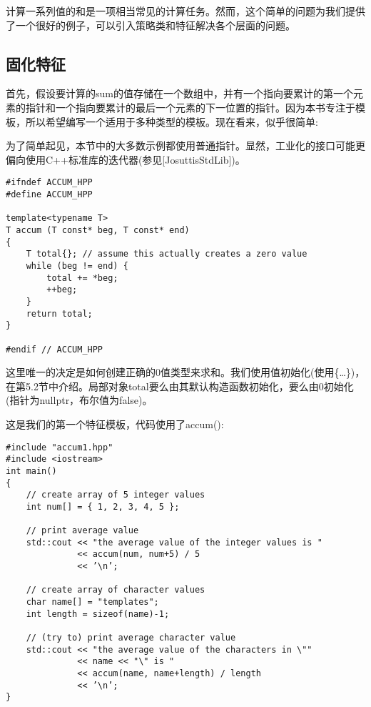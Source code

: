 
计算一系列值的和是一项相当常见的计算任务。然而，这个简单的问题为我们提供了一个很好的例子，可以引入策略类和特征解决各个层面的问题。

\subsection{固化特征}

首先，假设要计算的sum的值存储在一个数组中，并有一个指向要累计的第一个元素的指针和一个指向要累计的最后一个元素的下一位置的指针。因为本书专注于模板，所以希望编写一个适用于多种类型的模板。现在看来，似乎很简单:

\begin{tcolorbox}[colback=webgreen!5!white,colframe=webgreen!75!black]
\hspace*{0.75cm}为了简单起见，本节中的大多数示例都使用普通指针。显然，工业化的接口可能更偏向使用C++标准库的迭代器(参见[JosuttisStdLib])。
\end{tcolorbox}

\begin{lstlisting}[style=styleCXX]
#ifndef ACCUM_HPP
#define ACCUM_HPP

template<typename T>
T accum (T const* beg, T const* end)
{
	T total{}; // assume this actually creates a zero value
	while (beg != end) {
		total += *beg;
		++beg;
	}
	return total;
}

#endif // ACCUM_HPP
\end{lstlisting}

这里唯一的决定是如何创建正确的0值类型来求和。我们使用值初始化(使用\{…\})，在第5.2节中介绍。局部对象total要么由其默认构造函数初始化，要么由0初始化(指针为nullptr，布尔值为false)。

这是我们的第一个特征模板，代码使用了accum():

\begin{lstlisting}[style=styleCXX]
#include "accum1.hpp"
#include <iostream>
int main()
{
	// create array of 5 integer values
	int num[] = { 1, 2, 3, 4, 5 };
	
	// print average value
	std::cout << "the average value of the integer values is "
			  << accum(num, num+5) / 5
			  << ’\n’;
			  
	// create array of character values
	char name[] = "templates";
	int length = sizeof(name)-1;
	
	// (try to) print average character value
	std::cout << "the average value of the characters in \""
			  << name << "\" is "
			  << accum(name, name+length) / length
			  << ’\n’;
}
\end{lstlisting}

